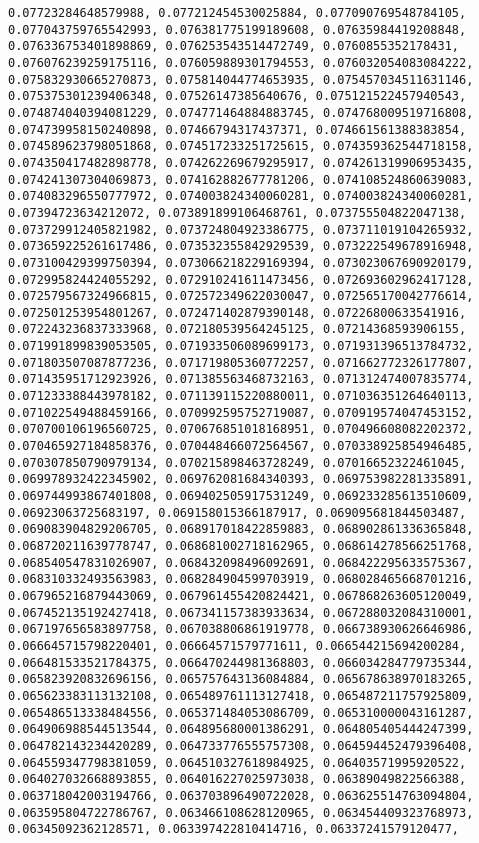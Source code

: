 \documentclass[11pt]{article}
\begin{document}
\begin{Verbatim}[commandchars=\\\{\}]
0.07723284648579988, 0.077212454530025884, 0.077090769548784105, 0.077043759765542993, 0.076381775199189608, 0.07635984419208848, 0.076336753401898869, 0.076253543514472749, 0.0760855352178431, 0.076076239259175116, 0.076059889301794553, 0.076032054083084222, 0.075832930665270873, 0.075814044774653935, 0.075457034511631146, 0.075375301239406348, 0.07526147385640676, 0.075121522457940543, 0.074874040394081229, 0.074771464884883745, 0.074768009519716808, 0.074739958150240898, 0.07466794317437371, 0.074661561388383854, 0.074589623798051868, 0.074517233251725615, 0.074359362544718158, 0.074350417482898778, 0.074262269679295917, 0.074261319906953435, 0.074241307304069873, 0.074162882677781206, 0.074108524860639083, 0.074083296550777972, 0.074003824340060281, 0.074003824340060281, 0.07394723634212072, 0.073891899106468761, 0.073755504822047138, 0.073729912405821982, 0.073724804923386775, 0.073711019104265932, 0.073659225261617486, 0.073532355842929539, 0.073222549678916948, 0.073100429399750394, 0.073066218229169394, 0.073023067690920179, 0.072995824424055292, 0.072910241611473456, 0.072693602962417128, 0.072579567324966815, 0.072572349622030047, 0.072565170042776614, 0.072501253954801267, 0.072471402879390148, 0.07226800633541916, 0.072243236837333968, 0.072180539564245125, 0.07214368593906155, 0.071991899839053505, 0.071933506089699173, 0.071931396513784732, 0.071803507087877236, 0.071719805360772257, 0.071662772326177807, 0.071435951712923926, 0.071385563468732163, 0.071312474007835774, 0.071233388443978182, 0.071139115220880011, 0.071036351264640113, 0.071022549488459166, 0.070992595752719087, 0.070919574047453152, 0.070700106196560725, 0.070676851018168951, 0.070496608082202372, 0.070465927184858376, 0.070448466072564567, 0.070338925854946485, 0.070307850790979134, 0.070215898463728249, 0.07016652322461045, 0.069978932422345902, 0.069762081684340393, 0.069753982281335891, 0.069744993867401808, 0.069402505917531249, 0.069233285613510609, 0.06923063725683197, 0.069158015366187917, 0.069095681844503487, 0.069083904829206705, 0.068917018422859883, 0.068902861336365848, 0.068720211639778747, 0.068681002718162965, 0.068614278566251768, 0.068540547831026907, 0.068432098496092691, 0.068422295633575367, 0.068310332493563983, 0.068284904599703919, 0.068028465668701216, 0.067965216879443069, 0.067961455420824421, 0.067868263605120049, 0.067452135192427418, 0.067341157383933634, 0.067288032084310001, 0.067197656583897758, 0.067038806861919778, 0.066738930626646986, 0.066645715798220401, 0.06664571579771611, 0.066544215694200284, 0.066481533521784375, 0.066470244981368803, 0.066034284779735344, 0.065823920832696156, 0.065757643136084884, 0.065678638970183265, 0.065623383113132108, 0.065489761113127418, 0.065487211757925809, 0.065486513338484556, 0.065371484053086709, 0.065310000043161287, 0.064906988544513544, 0.064895680001386291, 0.064805405444247399, 0.064782143234420289, 0.064733776555757308, 0.064594452479396408, 0.064559347798381059, 0.064510327618984925, 0.06403571995920522, 0.064027032668893855, 0.064016227025973038, 0.06389049822566388, 0.063718042003194766, 0.063703896490722028, 0.063625514763094804, 0.063595804722786767, 0.063466108628120965, 0.063454409323768973, 0.06345092362128571, 0.063397422810414716, 0.06337241579120477, 
\end{Verbatim}
\end{document}
